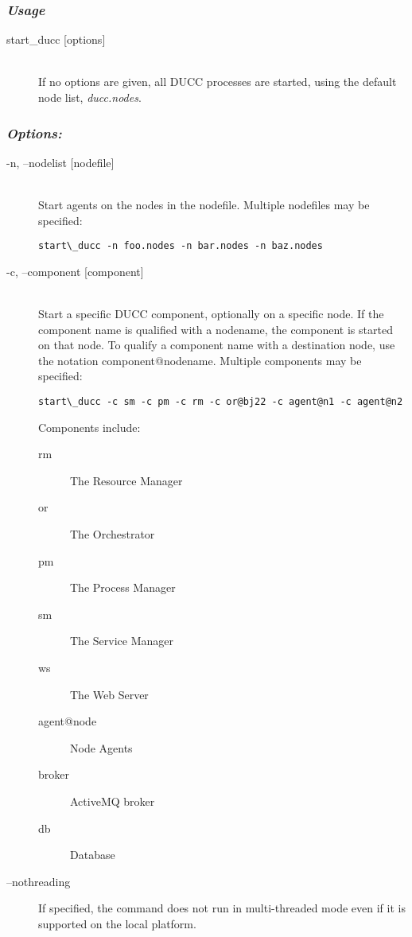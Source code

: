     \subsubsection{{\em Usage}}

    \begin{description}
      \item[start\_ducc {[options]}] \hfill \\ 
        If no options are given, all DUCC processes are started, using the default node list, 
        {\em ducc.nodes}. 
      
      \end{description}
      
      \subsubsection{{\em Options: }}
      \begin{description}

        \item[-n, --nodelist {[nodefile] }] \hfill \\
          Start agents on the nodes in the nodefile. Multiple nodefiles may be specified: 
\begin{verbatim}
start\_ducc -n foo.nodes -n bar.nodes -n baz.nodes 
\end{verbatim}
          

        \item[-c, --component {[component] }] \hfill \\
          Start a specific DUCC component, optionally on a specific node. If the component 
          name is qualified with a nodename, the component is started on that node. To qualify 
          a component name with a destination node, use the notation component@nodename. 
          Multiple components may be specified: 
\begin{verbatim}
start\_ducc -c sm -c pm -c rm -c or@bj22 -c agent@n1 -c agent@n2 
\end{verbatim}
          
          Components include: 
          \begin{description}
            \item[rm] The Resource Manager
            \item[or]The Orchestrator
            \item[pm]The Process Manager
            \item[sm]The Service Manager
            \item[ws]The Web Server
            \item[agent@node]Node Agents
            \item[broker] ActiveMQ broker
            \item[db] Database
          \end{description}

          \item[--nothreading] If specified, the command does not run in multi-threaded mode
            even if it is supported on the local platform.

      \end{description}

